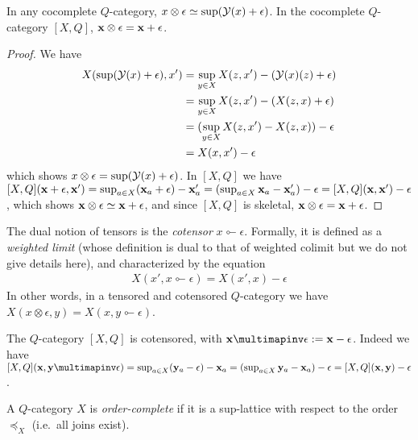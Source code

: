 \begin{lemma}
In any cocomplete $Q$-category, $x\otimes \epsilon \simeq \sup(  \mathcal{Y}(x)+\epsilon  )$.
In the cocomplete $Q$-category $[X,Q]$, $\mathbf{x}\otimes \epsilon= \mathbf{x}+\epsilon$.
\end{lemma}
\begin{proof}
We have 
\begin{align*}
X(\sup(\mathcal{Y}(x)+\epsilon), x')& =\sup_{y\in X}X(z,x')- (\mathcal{Y}(x)(z)+\epsilon)\\
&= \sup_{y\in X}X(z,x')-(X(z,x)+\epsilon)\\
&= (\sup_{y\in X}X(z,x')-X(z,x))-\epsilon\\
&= X(x,x')-\epsilon
\end{align*}
which shows $x\otimes \epsilon=\sup(\mathcal{Y}(x)+\epsilon)$. In $[X,Q]$ we have 
$[X,Q](\mathbf{x}+\epsilon, \mathbf{x}')=\sup_{a\in X}(\mathbf{x}_{a}+\epsilon)-\mathbf{x}'_{a}= (\sup_{a\in X}\mathbf{x}_{a}-\mathbf{x}'_{a})-\epsilon= [X,Q](\mathbf{x}, \mathbf{x}')-\epsilon$, which shows $\mathbf{x}\otimes \epsilon \simeq \mathbf{x}+\epsilon$, and since $[X,Q]$ is skeletal, $\mathbf{x}\otimes \epsilon=\mathbf{x}+\epsilon$.
\end{proof}


The dual notion of tensors is the \emph{cotensor} $x\multimapinv \epsilon$. Formally, it is defined as a \emph{weighted limit} (whose definition is dual to that of weighted colimit but we do not give details here), and characterized by the equation
\begin{align*}
X(x', x\multimapinv \epsilon)= X(x',x)-\epsilon
\end{align*}
In other words, in a tensored and cotensored $Q$-category we have $X(x\otimes \epsilon,y)= X(x,y\multimapinv \epsilon)$. 

\begin{example}
The $Q$-category $[X,Q]$ is cotensored, with $\B x\multimapinv \epsilon:= \B x-\epsilon$. Indeed we have $[X,Q](\B x, \B y\multimapinv \epsilon)=\sup_{a\in X}(\B y_{a}-\epsilon)-\B x_{a}=(\sup_{a\in X}\B y_{a}-\B x_{a})-\epsilon= [X,Q](\B x, \B y)-\epsilon$.
\end{example}

\begin{definition}
A $Q$-category $X$ is \emph{order-complete} if it is a sup-lattice with respect to the order $\preceq_{X}$ (i.e.~all joins exist).
\end{definition}


